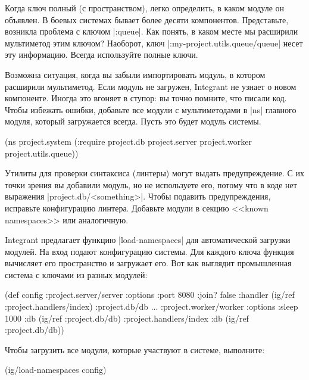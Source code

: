 Когда ключ полный (с пространством), легко определить, в каком модуле он
объявлен. В боевых системах бывает более десяти компонентов. Представьте,
возникла проблема с ключом \spverb|:queue|. Как понять, в каком месте мы
расширили мультиметод этим ключом? Наоборот, ключ
\spverb|:my-project.utils.queue/queue| несет эту информацию. Всегда используйте
полные ключи.

Возможна ситуация, когда вы забыли импортировать модуль, в котором расширили
мультиметод. Если модуль не загружен, Integrant не узнает о новом
компоненте. Иногда это вгоняет в ступор: вы точно помните, что писали код. Чтобы
избежать ошибки, добавьте все модули с мультиметодами в \spverb|ns| главного
модуля, который загружается всегда. Пусть это будет модуль системы.

\begin{english}
  \begin{clojure}
(ns project.system
  (:require project.db
            project.server
            project.worker
            project.utils.queue))
  \end{clojure}
\end{english}

Утилиты для проверки синтаксиса (линтеры) могут выдать предупреждение. С их
точки зрения вы добавили модуль, но не используете его, потому что в коде нет
выражения \spverb|project.db/<something>|. Чтобы подавить предупреждения,
исправьте конфигурацию линтера. Добавьте модули в секцию <<known namespaces>>
или аналогичную.

Integrant предлагает функцию \spverb|load-namespaces| для
автоматической загрузки модулей. На вход подают конфигурацию системы. Для
каждого ключа функция вычисляет его пространство и загружает его. Вот как
выглядит промышленная система с ключами из разных модулей:

\begin{english}
  \begin{clojure}
(def config
  {:project.server/server
   {:options {:port 8080 :join? false}
    :handler (ig/ref :project.handlers/index)}
   :project.db/db {...}
   :project.worker/worker
   {:options {:sleep 1000}
    :db      (ig/ref :project.db/db)}
   :project.handlers/index
   {:db (ig/ref :project.db/db)}})
  \end{clojure}
\end{english}

Чтобы загрузить все модули, которые участвуют в системе, выполните:

\begin{english}
  \begin{clojure}
(ig/load-namespaces config)
  \end{clojure}
\end{english}

